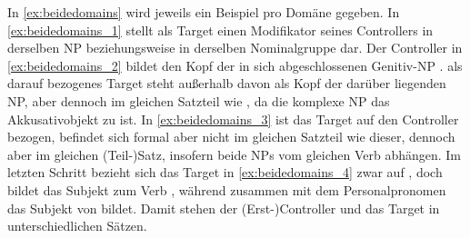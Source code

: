 In \cref{ex:beidedomains} wird jeweils ein Beispiel pro Domäne gegeben. In
\cref{ex:beidedomains_1} stellt   als Target einen
Modifikator seines Controllers   in derselben
NP beziehungsweise in derselben Nominalgruppe dar. Der Controller 
 in \cref{ex:beidedomains_2} bildet den Kopf der in sich
abgeschlossenen Genitiv-NP  .   als darauf bezogenes Target
steht außerhalb davon als Kopf der darüber liegenden NP, aber dennoch im
gleichen Satzteil wie  , da die komplexe NP
  das Akkusativobjekt zu  
ist. In \cref{ex:beidedomains_3} ist das Target   auf
den Controller   bezogen, befindet sich formal aber
nicht im gleichen Satzteil wie dieser, dennoch aber im gleichen (Teil-)Satz,
insofern beide NPs vom gleichen Verb   abhängen.
Im letzten Schritt bezieht sich das Target   in
\cref{ex:beidedomains_4} zwar auf  , doch bildet
 das Subjekt zum Verb  , während
 zusammen mit dem Personalpronomen   das
Subjekt von   bildet. Damit stehen der
(Erst-)Controller  und das Target  in unterschiedlichen
Sätzen.

